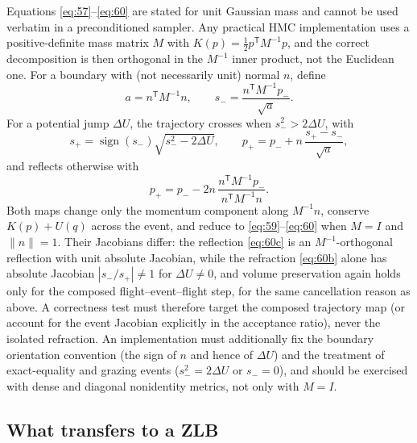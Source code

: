 \documentclass[11pt]{article}
\begin{document}
Equations \eqref{eq:57}--\eqref{eq:60} are stated for unit Gaussian mass and
cannot be used verbatim in a preconditioned sampler. Any practical HMC
implementation uses a positive-definite mass matrix $M$ with
$K(p)=\tfrac12 p^{\mathsf T}M^{-1}p$, and the correct decomposition is then
orthogonal in the $M^{-1}$ inner product, not the Euclidean one. For a
boundary with (not necessarily unit) normal $n$, define
\begin{equation}\label{eq:60a}
 a=n^{\mathsf T}M^{-1}n,
 \qquad
 s_-=\frac{n^{\mathsf T}M^{-1}p_-}{\sqrt a}.
\end{equation}
For a potential jump $\Delta U$, the trajectory crosses when
$s_-^2>2\Delta U$, with
\begin{equation}\label{eq:60b}
 s_+=\operatorname{sign}(s_-)\sqrt{s_-^2-2\Delta U},
 \qquad
 p_+=p_-+n\,\frac{s_+-s_-}{\sqrt a},
\end{equation}
and reflects otherwise with
\begin{equation}\label{eq:60c}
 p_+=p_--2n\,\frac{n^{\mathsf T}M^{-1}p_-}{n^{\mathsf T}M^{-1}n}.
\end{equation}
Both maps change only the momentum component along $M^{-1}n$, conserve
$K(p)+U(q)$ across the event, and reduce to \eqref{eq:59}--\eqref{eq:60}
when $M=I$ and $\|n\|=1$. Their Jacobians differ: the reflection
\eqref{eq:60c} is an $M^{-1}$-orthogonal reflection with unit absolute
Jacobian, while the refraction \eqref{eq:60b} alone has absolute Jacobian
$|s_-/s_+|\neq1$ for $\Delta U\neq0$, and volume preservation again holds
only for the composed flight--event--flight step, for the same
cancellation reason as above. A correctness test must therefore target the
composed trajectory map (or account for the event Jacobian explicitly in the
acceptance ratio), never the isolated refraction. An implementation must
additionally fix the boundary orientation convention (the sign of $n$ and
hence of $\Delta U$) and the treatment of exact-equality and grazing events
($s_-^2=2\Delta U$ or $s_-=0$), and should be exercised with dense and
diagonal nonidentity metrics, not only with $M=I$.

\subsection{What transfers to a ZLB}\label{sec:event-zlb}
\end{document}
